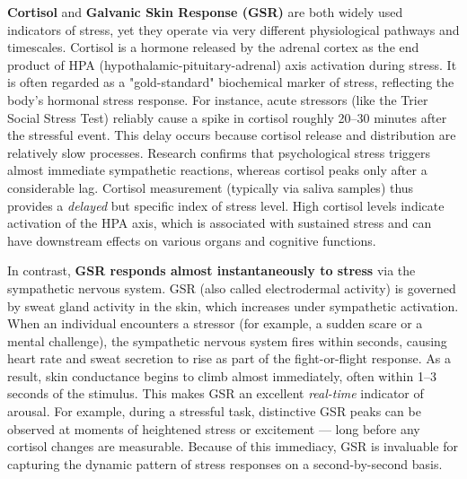 \documentclass[11pt,a4paper]{report}
\begin{document}
\textbf{Cortisol} and \textbf{Galvanic Skin Response (GSR)} are both widely used indicators of stress, yet they operate via very different physiological pathways and timescales. Cortisol is a hormone released by the adrenal cortex as the end product of HPA (hypothalamic-pituitary-adrenal) axis activation during stress. It is often regarded as a "gold-standard" biochemical marker of stress, reflecting the body's hormonal stress response. For instance, acute stressors (like the Trier Social Stress Test) reliably cause a spike in cortisol roughly 20–30 minutes after the stressful event\cite{CortisolStressIndicator2020}. This delay occurs because cortisol release and distribution are relatively slow processes. Research confirms that psychological stress triggers almost immediate sympathetic reactions, whereas cortisol peaks only after a considerable lag\cite{CortisolStressIndicator2020}. Cortisol measurement (typically via saliva samples) thus provides a \textit{delayed} but specific index of stress level. High cortisol levels indicate activation of the HPA axis, which is associated with sustained stress and can have downstream effects on various organs and cognitive functions.

In contrast, \textbf{GSR responds almost instantaneously to stress} via the sympathetic nervous system. GSR (also called electrodermal activity) is governed by sweat gland activity in the skin, which increases under sympathetic activation. When an individual encounters a stressor (for example, a sudden scare or a mental challenge), the sympathetic nervous system fires within seconds, causing heart rate and sweat secretion to rise as part of the fight-or-flight response\cite{CortisolStressIndicator2020}. As a result, skin conductance begins to climb almost immediately, often within 1–3 seconds of the stimulus\cite{ElectrodermalActivityWiki}. This makes GSR an excellent \textit{real-time} indicator of arousal. For example, during a stressful task, distinctive GSR peaks can be observed at moments of heightened stress or excitement — long before any cortisol changes are measurable\cite{CortisolStressIndicator2020}. Because of this immediacy, GSR is invaluable for capturing the dynamic pattern of stress responses on a second-by-second basis.
\end{document}
